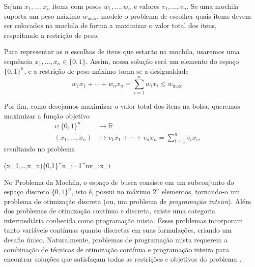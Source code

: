 \begin{exemplo}
	Sejam $x_1,\dots,x_n$ items com pesos $w_1,\dots,w_n$ e valores $v_1,\dots,v_n$. Se uma mochila suporta um peso máximo $w_\text{max}$, modele o problema de escolher quais items devem ser colocados na mochila de forma a maximizar o valor total dos itens, respeitando a restrição de peso.
	\begin{solucao}
		Para representar as $n$ escolhas de itens que estarão na mochila, usaremos uma sequência $x_1,\dots,x_n \in \{0,1\}$. Assim, nossa solução será um elemento do espaço $\{0,1\}^n$, e a restrição de peso máximo torna-se a desigualdade $$w_1x_1+\cdots+w_nx_n = \sum_{i=1}^{n} w_ix_i\leq w_\text{max}.$$
		
		Por fim, como desejamos maximizar o valor total dos itens na bolsa, queremos maximizar a função objetivo
		\begin{align*}
			v: \{0,1\}^n &\to  \mathbb{R}\\
			(x_1,\dots,x_n) &\mapsto v_1x_1+\cdots+v_nx_n = \sum_{i=1}^{n}v_ix_i,
		\end{align*}
		resultando no problema
		\begin{maxi}
			{(x_1,\dots,x_n)\in\{0,1\}^n}{\sum_{i=1}^{n}v_ix_i}{}{}
		\end{maxi}
	\end{solucao}
\end{exemplo}

No Problema da Mochila, o espaço de busca consiste em um subconjunto do espaço discreto $\{0,1\}^n$, isto é, possui no máximo $2^n$ elementos, tornando-o um problema de otimização discreta (ou, um problema de \textit{programação inteira}). Além dos problemas de otimização contínua e discreta, existe uma categoria intermediária conhecida como programação mista. Esses problemas incorporam tanto variáveis contínuas quanto discretas em suas formulações, criando um desafio único. 
Naturalmente, problemas de programação mista requerem a combinação de técnicas de otimização contínua e programação inteira para encontrar soluções que satisfaçam todas as restrições e objetivos do problema \cite{nocedalNumericalOptimization}.

